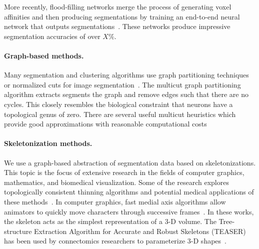 More recently, flood-filling networks merge the process of generating voxel affinities and then producing segmentations by training an end-to-end neural network that outputs segmentations~\cite{januszewski2016flood}. 
These networks produce impressive segmentation accuracies of over $X\%$.%

\paragraph{Graph-based methods.} 
Many segmentation and clustering algorithms use graph partitioning techniques~\cite{andres2012globally} or normalized cuts for image segmentation~\cite{kappes2016higher,shi2000normalized,tatiraju2008image}. 
The multicut graph partitioning algorithm extracts segments the graph and remove edges such that there are no cycles. 
This closely resembles the biological constraint that neurons have a topological genus of zero. 
There are several useful multicut heuristics which provide good approximations with reasonable computational costs~\cite{horvnakova2017analysis,kernighan1970efficient,keuper2015efficient}

\paragraph{Skeletonization methods.} We use a graph-based abstraction of segmentation data based on skeletonizations. 
This topic is the focus of extensive research in the fields of computer graphics, mathematics, and biomedical visualization.
Some of the research explores topologically consistent thinning algorithms and potential medical applications of these methods~\cite{palagyi20003d,palagyi2001sequential}. 
In computer graphics, fast medial axis algorithms allow animators to quickly move characters through successive frames~\cite{baran2007automatic,bharaj2012automatically}. 
In these works, the skeleton acts as the simplest representation of a 3-D volume. 
The Tree-structure Extraction Algorithm for Accurate and Robust Skeletons (TEASER) has been used by connectomics researchers to parameterize 3-D shapes~\cite{sato2000teasar,zhao2014automatic}. 

